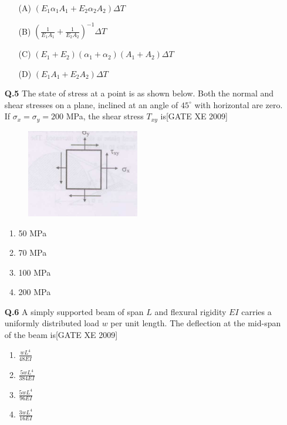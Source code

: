 \documentclass[journal,12pt,onecolumn]{IEEEtran}
\theoremstyle{remark}
\begin{document}
\begin{enumerate}
\begin{itemize}
    \item[(A)] $(E_1 \alpha_1 A_1 + E_2 \alpha_2 A_2) \Delta T$
    \item[(B)] $\left( \frac{1}{E_1 A_1} + \frac{1}{E_2 A_2} \right)^{-1} \Delta T$
    \item[(C)] $(E_1 + E_2)(\alpha_1 + \alpha_2)(A_1 + A_2) \Delta T$
    \item[(D)] $(E_1 A_1 + E_2 A_2) \Delta T$
\end{itemize}
\item[\textbf{Q.5}] The state of stress at a point is as shown below. Both the normal and shear stresses on a plane, inclined at an angle of $45^\circ$ with horizontal are zero. If $\sigma_x = \sigma_y = 200$ MPa, the shear stress $T_{xy}$ is\hfill[GATE XE 2009]\\
\begin{figure}[h]
    \centering
    \includegraphics[width=0.5\columnwidth]{figs/fig9.png}
\end{figure}
   

\begin{multicols}{2}
\begin{enumerate}
    \item 50 MPa
    \item 70 MPa
    \item 100 MPa
    \item 200 MPa
\end{enumerate}
\end{multicols}



\bigskip
\item[\textbf{Q.6}]  A simply supported beam of span $L$ and flexural rigidity $EI$ carries a uniformly distributed load $w$ per unit length. The deflection at the mid-span of the beam is\hfill[GATE XE 2009]\\
\begin{multicols}{2}
\begin{enumerate}
    \item $\frac{wL^4}{48EI}$
    \item $\frac{5wL^4}{384EI}$
    \item $\frac{5wL^4}{96EI}$
    \item $\frac{3wL^4}{16EI}$
\end{enumerate}
\end{multicols}


\end{enumerate}
\end{document}
